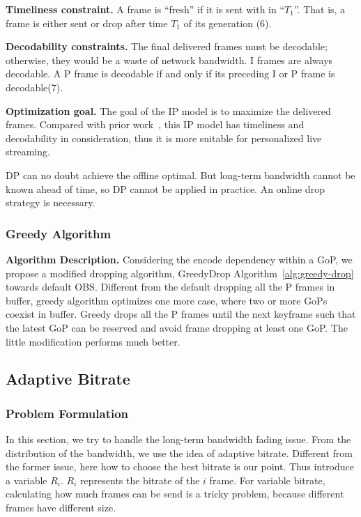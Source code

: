 \textbf{Timeliness constraint.}
A frame is ``fresh'' if it is sent with in ``$T_1$''. That is, a frame is either sent or drop after time $T_1$ of its generation (6).

\textbf{Decodability constraints.} The final delivered frames must be decodable; otherwise, they would be a waste of network bandwidth. I frames are always decodable. A P frame is decodable if and only if its preceding I or P frame is decodable(7).

\textbf{Optimization goal.} The goal of the IP model is to maximize the delivered frames.
Compared with prior work~\cite{singh2004dynamic}, this IP model has timeliness and decodability in consideration, thus it is more suitable for personalized live streaming.

DP can no doubt achieve the offline optimal. But long-term bandwidth cannot be known ahead of time, so DP cannot be applied in practice. An online drop strategy is necessary.

\subsubsection{Greedy Algorithm}

\textbf{Algorithm Description.} Considering the encode dependency within a GoP, we propose a modified dropping algorithm, GreedyDrop Algorithm~\ref{alg:greedy-drop} towards default OBS. Different from the
default dropping all the P frames in buffer, greedy algorithm optimizes one more case, where two or more GoPs coexist in buffer. Greedy drops all the P frames until the next keyframe such that the latest GoP can be reserved and avoid frame dropping at least one GoP. The little modification performs much better.

\subsection{Adaptive Bitrate}
\subsubsection{Problem Formulation}


In this section, we try to handle the long-term bandwidth fading issue. From the distribution of the bandwidth, we use the idea of adaptive bitrate. Different from the former issue, here how to choose the best bitrate is our point. Thus introduce a variable $R_{i}$. $R_{i}$ represents the bitrate of the $i$ frame. For variable bitrate, calculating how much frames can be send is a tricky problem, because different frames have different size.

